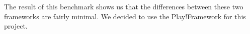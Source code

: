 
The result of this benchmark shows us that the differences between these two frameworks are fairly minimal. We decided to use the Play!Framework for this project.
\newpage

